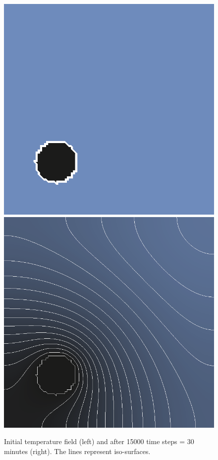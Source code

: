 \begin{figure}[!htb]
  \centering
  \includegraphics[width=.4\textwidth]{figures/hot-point-1}
  \hfill
  \includegraphics[width=.4\textwidth]{figures/hot-point-2}
  \caption{Initial temperature field (left) and after 15000 time steps = 30 minutes (right). The lines represent iso-surfaces.}
  \label{fig:htm:explicit:dynamic}
\end{figure}


